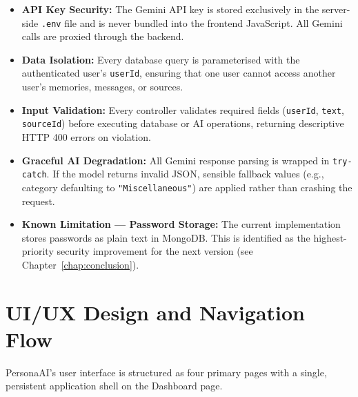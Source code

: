 \documentclass[12pt,a4paper]{report}
\begin{document}
\begin{itemize}
  \item \textbf{API Key Security:} The Gemini API key is stored exclusively in the server-side \texttt{.env} file and is never bundled into the frontend JavaScript. All Gemini calls are proxied through the backend.
  \item \textbf{Data Isolation:} Every database query is parameterised with the authenticated user's \texttt{userId}, ensuring that one user cannot access another user's memories, messages, or sources.
  \item \textbf{Input Validation:} Every controller validates required fields (\texttt{userId}, \texttt{text}, \texttt{sourceId}) before executing database or AI operations, returning descriptive HTTP 400 errors on violation.
  \item \textbf{Graceful AI Degradation:} All Gemini response parsing is wrapped in \texttt{try-catch}. If the model returns invalid JSON, sensible fallback values (e.g., category defaulting to \texttt{"Miscellaneous"}) are applied rather than crashing the request.
  \item \textbf{Known Limitation — Password Storage:} The current implementation stores passwords as plain text in MongoDB. This is identified as the highest-priority security improvement for the next version (see Chapter~\ref{chap:conclusion}).
\end{itemize}

\section{UI/UX Design and Navigation Flow}

PersonaAI's user interface is structured as four primary pages with a single, persistent application shell on the Dashboard page.
\end{document}
